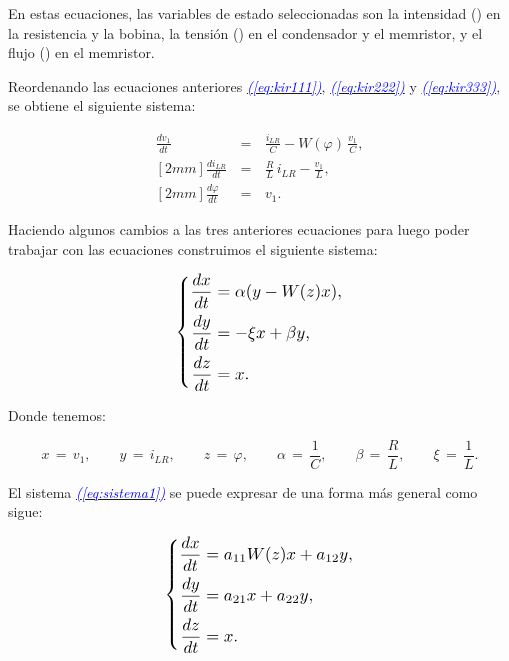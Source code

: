 \documentclass[12pt,a4paper]{report} %
\newcommand{\eref}[1]{\hyperref[#1]{\textcolor{blue}{\textit{(\ref*{#1})}}}}
\begin{document}
		\vspace{0.5cm}\noindent En estas ecuaciones, las variables de estado seleccionadas son la intensidad () en la resistencia y la bobina, la tensión () en el condensador y el memristor, y el flujo (\bm{$\varphi$}) en el memristor.
	
	\vspace{0.5cm}\noindent Reordenando las ecuaciones anteriores \eref{eq:kir111}, \eref{eq:kir222} y \eref{eq:kir333}, se obtiene el siguiente sistema:
	
	\begin{eqnarray}
		\frac{dv_1}{dt}\,&=&\,\frac{i_{LR}}{C}-W(\varphi)\,\frac{v_1}{C} \label{eq:sis1}, \\ [2mm]
		\frac{di_{LR}}{dt}\,&=&\,\frac{R}{L}\,i_{LR}-\frac{v_1}{L} \label{eq:sis2}, \\ [2mm]
		\frac{d\varphi}{dt}\,&=&\,v_1. \label{eq:sis3}
	\end{eqnarray}\smallskip
	
	\vspace{0.5cm}\noindent Haciendo algunos cambios a las tres anteriores ecuaciones para luego poder trabajar con las ecuaciones construimos el siguiente sistema:
    
	\vspace{0.5cm}\begin{equation}
		\label{eq:sistema1}
		\scalebox{1.2}{$\displaystyle
			\left\{
			\begin{aligned}
				\frac{dx}{dt} &= \alpha (y - W(z)x), \\
				\frac{dy}{dt} &= -\xi x + \beta y, \\
				\frac{dz}{dt} &= x.
			\end{aligned}
			\right.
			$}
	\end{equation}\smallskip
	
	\noindent Donde tenemos:
	
	\begin{equation*}
		x\,=\,v_1, \qquad y\,=\,i_{LR}, \qquad z\,=\,\varphi, \qquad \alpha\,=\,\frac{1}{C}, \qquad \beta\,=\,\frac{R}{L}, \qquad \xi\,=\,\frac{1}{L}.
	\end{equation*}
	
	\newpage
	
	El sistema \eref{eq:sistema1} se puede expresar de una forma más general como sigue:
	
	\begin{equation}
		\label{eq:sistema}
		\scalebox{1.2}{$\displaystyle
			\left\{
			\begin{aligned}
				\frac{dx}{dt} &= a_{11}W(z)x+a_{12}y, \\
				\frac{dy}{dt} &=  a_{21}x+ a_{22}y, \\
				\frac{dz}{dt} &= x.
			\end{aligned}
			\right.
			$}
	\end{equation}\smallskip
	
\end{document}
